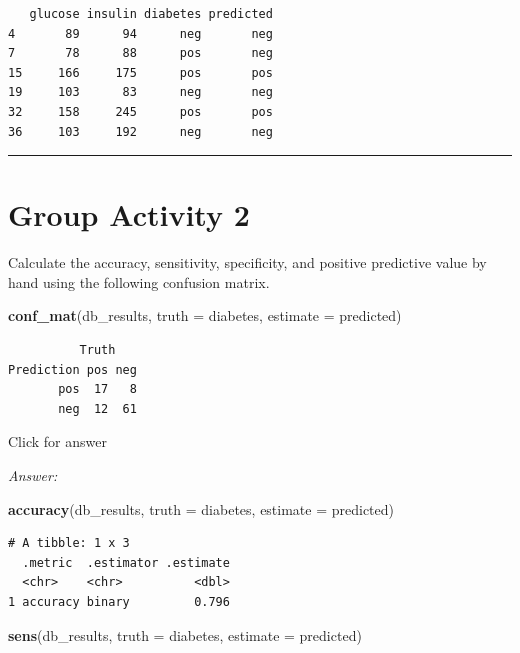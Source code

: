 \documentclass[
]{book}
\newenvironment{Shaded}{\begin{snugshade}}{\end{snugshade}}
\newcommand{\AttributeTok}[1]{\textcolor[rgb]{0.13,0.29,0.53}{#1}}
\newcommand{\FunctionTok}[1]{\textcolor[rgb]{0.13,0.29,0.53}{\textbf{#1}}}
\newcommand{\NormalTok}[1]{#1}
\begin{document}
\begin{verbatim}
   glucose insulin diabetes predicted
4       89      94      neg       neg
7       78      88      pos       neg
15     166     175      pos       pos
19     103      83      neg       neg
32     158     245      pos       pos
36     103     192      neg       neg
\end{verbatim}

\begin{center}\rule{0.5\linewidth}{0.5pt}\end{center}

\hypertarget{group-activity-2-6}{%
\section{Group Activity 2}\label{group-activity-2-6}}

Calculate the accuracy, sensitivity, specificity, and positive predictive value by hand using the following confusion matrix.

\begin{Shaded}
\begin{Highlighting}[]
\FunctionTok{conf\_mat}\NormalTok{(db\_results, }\AttributeTok{truth =}\NormalTok{ diabetes, }\AttributeTok{estimate =}\NormalTok{ predicted)}
\end{Highlighting}
\end{Shaded}

\begin{verbatim}
          Truth
Prediction pos neg
       pos  17   8
       neg  12  61
\end{verbatim}

Click for answer

\emph{Answer:}

\begin{Shaded}
\begin{Highlighting}[]
\FunctionTok{accuracy}\NormalTok{(db\_results, }\AttributeTok{truth =}\NormalTok{ diabetes,}
         \AttributeTok{estimate =}\NormalTok{ predicted)}
\end{Highlighting}
\end{Shaded}

\begin{verbatim}
# A tibble: 1 x 3
  .metric  .estimator .estimate
  <chr>    <chr>          <dbl>
1 accuracy binary         0.796
\end{verbatim}

\begin{Shaded}
\begin{Highlighting}[]
\FunctionTok{sens}\NormalTok{(db\_results, }\AttributeTok{truth =}\NormalTok{ diabetes,}
         \AttributeTok{estimate =}\NormalTok{ predicted)}
\end{Highlighting}
\end{Shaded}
\end{document}
